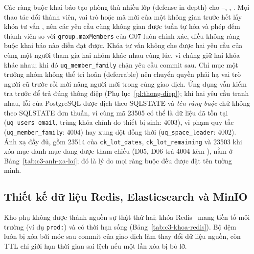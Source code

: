 Các ràng buộc khai báo tạo phòng thủ nhiều lớp (defense in depth) cho --, , . Mọi thao tác đổi thành viên, vai trò hoặc mã mời của một không gian trước hết lấy khóa tư vấn , nên các yêu cầu cùng không gian được tuần tự hóa và phép đếm thành viên so với \texttt{group.maxMembers} của G07 luôn chính xác, điều không ràng buộc khai báo nào diễn đạt được. Khóa tư vấn không che được hai yêu cầu của cùng một người tham gia hai nhóm khác nhau cùng lúc, vì chúng giữ hai khóa khác nhau; khi đó \texttt{uq\_member\_family} chặn yêu cầu commit sau. Chỉ mục một trưởng nhóm không thể trì hoãn (deferrable) nên chuyển quyền  phải hạ vai trò người cũ trước rồi mới nâng người mới trong cùng giao dịch. Ứng dụng vẫn kiểm tra trước để trả đúng thông điệp (Phụ lục~\ref{pl:thong-diep}); khi hai yêu cầu tranh nhau, lỗi của PostgreSQL được dịch theo SQLSTATE và \emph{tên ràng buộc} chứ không theo SQLSTATE đơn thuần, vì cùng mã 23505 có thể là dữ liệu đã tồn tại (\texttt{uq\_users\_email}, trùng khóa chính do thiết bị sinh: 4003), vi phạm quy tắc (\texttt{uq\_member\_family}: 4004) hay xung đột đồng thời (\texttt{uq\_space\_leader}: 4002). Ánh xạ đầy đủ, gồm 23514 của \texttt{ck\_lot\_dates}, \texttt{ck\_lot\_remaining} và 23503 khi xóa mục danh mục đang được tham chiếu (D05, D06 trả 4004 kèm ), nằm ở Bảng~\ref{tab:c3-anh-xa-loi}; đó là lý do mọi ràng buộc đều được đặt tên tường minh.

\subsection{Thiết kế dữ liệu Redis, Elasticsearch và MinIO}\label{ssec:du-lieu-phu}

Kho phụ không được thành nguồn sự thật thứ hai; khóa Redis~\cite{redis} mang tiền tố môi trường (ví dụ \texttt{prod:}) và có thời hạn sống (Bảng~\ref{tab:c3-khoa-redis}). Bộ đệm luôn bị xóa bởi móc sau commit của giao dịch làm thay đổi dữ liệu nguồn, còn TTL chỉ giới hạn thời gian sai lệch nếu một lần xóa bị bỏ lỡ.

